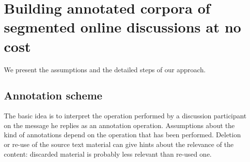 

\section{Building annotated corpora of segmented online discussions at no cost}
\label{sec:buildingannotatedcorpusofsegmentedonlinemessageatnocost}

We present the assumptions and the detailed steps of our approach.

\subsection{Annotation scheme}
\label{sec:annotationscheme}


The basic idea is to interpret the operation performed by a discussion participant on the message he replies as an annotation operation. 
Assumptions about the kind of annotations depend on the operation that has been performed.
Deletion or re-use of the source text material can give hints about the relevance of the content: discarded material is probably less relevant than re-used one.

